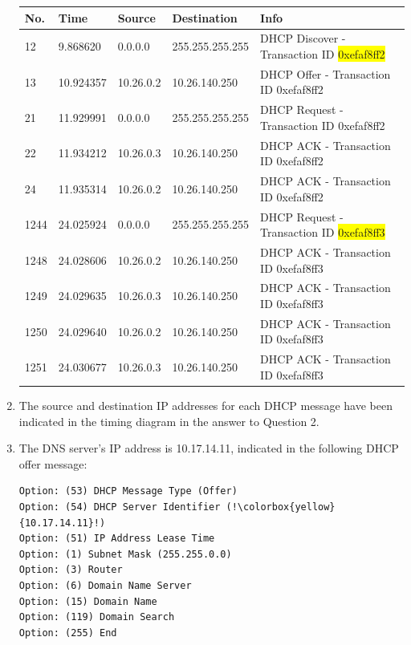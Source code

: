 \documentclass{article}
\begin{document}
\begin{enumerate}
    \begin{tabular}{@{}lllll@{}}
    \toprule
    No.  & Time      & Source    & Destination     & Info                                      \\ \midrule
    12   & 9.868620  & 0.0.0.0   & 255.255.255.255 & DHCP Discover - Transaction ID \colorbox{yellow}{0xefaf8ff2} \\
    13   & 10.924357 & 10.26.0.2 & 10.26.140.250   & DHCP Offer    - Transaction ID 0xefaf8ff2 \\
    21   & 11.929991 & 0.0.0.0   & 255.255.255.255 & DHCP Request  - Transaction ID 0xefaf8ff2 \\
    22   & 11.934212 & 10.26.0.3 & 10.26.140.250   & DHCP ACK      - Transaction ID 0xefaf8ff2 \\
    24   & 11.935314 & 10.26.0.2 & 10.26.140.250   & DHCP ACK      - Transaction ID 0xefaf8ff2 \\
    1244 & 24.025924 & 0.0.0.0   & 255.255.255.255 & DHCP Request  - Transaction ID \colorbox{yellow}{0xefaf8ff3} \\
    1248 & 24.028606 & 10.26.0.2 & 10.26.140.250   & DHCP ACK      - Transaction ID 0xefaf8ff3 \\
    1249 & 24.029635 & 10.26.0.3 & 10.26.140.250   & DHCP ACK      - Transaction ID 0xefaf8ff3 \\
    1250 & 24.029640 & 10.26.0.2 & 10.26.140.250   & DHCP ACK      - Transaction ID 0xefaf8ff3 \\
    1251 & 24.030677 & 10.26.0.3 & 10.26.140.250   & DHCP ACK      - Transaction ID 0xefaf8ff3 \\ \bottomrule
    \end{tabular}

    \item The source and destination IP addresses for each DHCP message have been indicated in the timing diagram in the answer to Question 2.
    
    \item The DNS server's IP address is 10.17.14.11, indicated in the following DHCP offer message:
\begin{verbatim}
Option: (53) DHCP Message Type (Offer)
Option: (54) DHCP Server Identifier (!\colorbox{yellow}{10.17.14.11}!)
Option: (51) IP Address Lease Time
Option: (1) Subnet Mask (255.255.0.0)
Option: (3) Router
Option: (6) Domain Name Server
Option: (15) Domain Name
Option: (119) Domain Search
Option: (255) End
\end{verbatim}


\end{enumerate}
\end{document}
